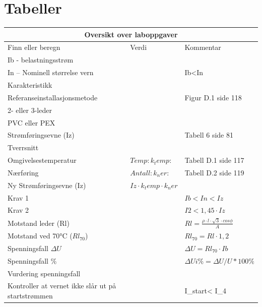 
\section{Tabeller}

\begin{center}
	\begin{tabular}{| m{4cm} |m{4cm} |m{4cm} |} 
\hline
	\multicolumn{3}{|c|}{\textbf{\cellcolor[HTML]{D5D5D5}Oversikt over laboppgaver}} \\
\hline
\hline
\rowcolor [HTML]{D5D5D5}
Finn eller beregn 		&Verdi				&Kommentar							\\ \cline{1-3}
Ib - belastningsstrøm		&				&								\\ \cline{1-3}
In – Nominell størrelse vern	&				&Ib<In								\\ \cline{1-3}
Karakteristikk			&				&								\\ \cline{1-3}
Referanseinstallasjonsmetode	&				&Figur D.1 side 118						\\ \cline{1-3}
2- eller 3-leder		&				&								\\ \cline{1-3}
PVC eller PEX			&				&								\\ \cline{1-3}
Strømføringsevne (Iz) 		&				&Tabell 6 side 81						\\ \cline{1-3}
Tverrsnitt			&				&								\\ \cline{1-3}
Omgivelsestemperatur		&$Temp:	k_temp:$		&Tabell D.1 side 117						\\ \cline{1-3}
Nærføring			&$Antall:	k_ner:$		&Tabell D.2 side 119						\\ \cline{1-3}
Ny Strømføringsevne (Iz)	&$Iz\cdot k_temp \cdot k_ner$ 	&								\\ \cline{1-3}
Krav 1				&				&$Ib<In<Iz$							\\ \cline{1-3}
Krav 2				&				&$I2<1,45 \cdot Iz$						\\ \cline{1-3}
Motstand leder (Rl) 		&				&$Rl= \frac {\rho \cdot l \cdot \sqrt{3} \cdot cos\phi}{A}$ 	\\ \cline{1-3}
Motstand ved 70°C ($Rl_{70}$)	&				&$Rl_70=Rl \cdot 1,2$						\\ \cline{1-3}
Spenningsfall $\Delta U$	&				&$\Delta U=Rl_70 \cdot Ib$					\\ \cline{1-3}
Spenningsfall \%  		&				&$\Delta Ui \%=  \Delta U/U*100\%$				\\ \cline{1-3}
Vurdering spenningsfall 	&				&								\\ \cline{1-3}
Kontroller at vernet ikke slår ut på startstrømmen 	& 				&I_start< I_4 							\\ \cline{1-3}

\end{tabular}
\end{center}
